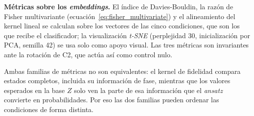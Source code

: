 \textbf{Métricas sobre los \textit{embeddings}.} El índice de Davies-Bouldin, la razón de
Fisher multivariante (ecuación~\eqref{eq:fisher_multivariate}) y el alineamiento del kernel lineal se
calculan sobre los vectores de las cinco condiciones, que son los que recibe el
clasificador; la visualización \textit{t-SNE} (perplejidad 30, inicialización por PCA,
semilla 42) se usa solo como apoyo visual. Las tres métricas son invariantes ante la
rotación de C2, que actúa así como control nulo.

Ambas familias de métricas no son equivalentes: el kernel de fidelidad compara estados
completos, incluida su información de fase, mientras que los valores esperados en la
base $Z$ solo ven la parte de esa información que el \textit{ansatz} convierte en probabilidades.
Por eso las dos familias pueden ordenar las condiciones de forma distinta.
